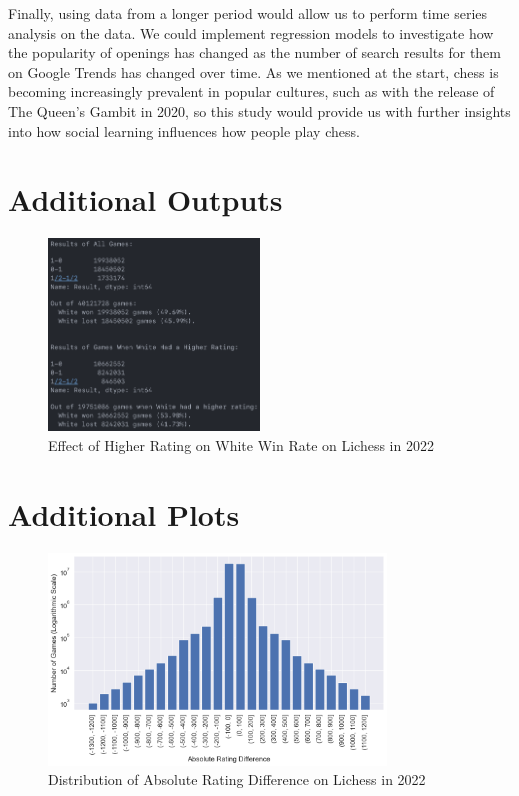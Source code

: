 \documentclass[a4paper, 11pt]{article}
\begin{document}
Finally, using data from a longer period would allow us to perform time series analysis on the data. We could implement regression models to investigate how the popularity of openings has changed as the number of search results for them on Google Trends has changed over time. As we mentioned at the start, chess is becoming increasingly prevalent in popular cultures, such as with the release of The Queen's Gambit in 2020, so this study would provide us with further insights into how social learning influences how people play chess.




\newpage
\begin{appendices}

\section{Additional Outputs}
\begin{figure}[H]
    \centering
    \caption{Effect of Higher Rating on White Win Rate on Lichess in 2022}
    \label{fig:effectOfHigherRatingOnWhiteWinRate}
    \includegraphics[width=0.5\textwidth]{Effect of Higher Rating on White Win Rate.png}
\end{figure}

\section{Additional Plots}
\begin{figure}[H]
    \centering
    \caption{Distribution of Absolute Rating Difference on Lichess in 2022}
    \label{fig:distributionOfAbsoluteRatingDifference}
    \includegraphics[width=0.8\textwidth]{Distribution of Absolute Rating Difference.png}
\end{figure}


\end{appendices}
\end{document}
